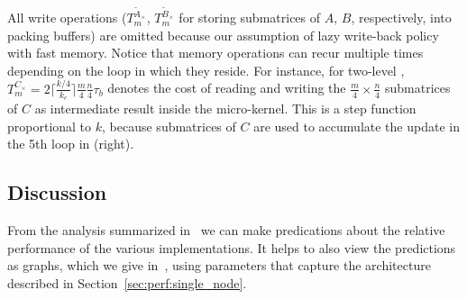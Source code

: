 All write operations ($T_{m}^{{\widetilde A}_{\times}}$, $T_{m}^{{\widetilde B}_{\times}}$ for storing submatrices of $A$, $B$, respectively, into packing buffers) are omitted because our assumption of lazy write-back policy with fast memory. Notice that memory operations can recur multiple times depending on the loop in which they reside.
For instance, for two-level \strassen{},
{$T_{m}^{C_{\times}}=2\lceil\frac{k/4}{k_c}\rceil \frac{m}{4}\frac{n}{4}\tau_{b}$}
denotes the cost of reading and writing the $\frac{m}{4}\times \frac{n}{4}$ submatrices of $C$ as intermediate result inside the micro-kernel. This is a step function proportional to $k$, because submatrices of $C$ are used to accumulate the \rankk{} update in the 5th loop in (right).




\subsection{Discussion}
From the analysis summarized in~ we can 
make predications about the relative performance of the various implementations.  It helps to also view the predictions as graphs, 
which we give in~, using parameters that capture the architecture described in Section~\ref{sec:perf:single_node}.

